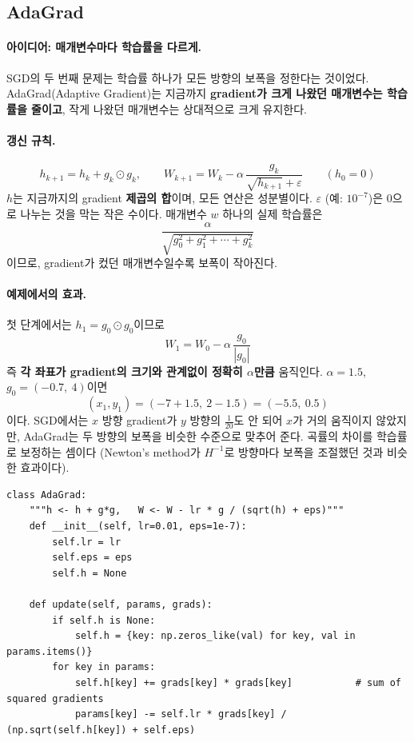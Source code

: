 \documentclass[11pt,a4paper]{article}
\begin{document}
\subsection{AdaGrad}\label{sec:adagrad}

\paragraph{아이디어: 매개변수마다 학습률을 다르게.}
SGD의 두 번째 문제는 학습률 하나가 모든 방향의 보폭을 정한다는 것이었다.
AdaGrad(Adaptive Gradient)는 지금까지 \textbf{gradient가 크게 나왔던 매개변수는 학습률을 줄이고},
작게 나왔던 매개변수는 상대적으로 크게 유지한다.

\paragraph{갱신 규칙.}
\[
\boxed{
h_{k+1}=h_k+g_k\odot g_k,
\qquad
W_{k+1}=W_k-\alpha\,\frac{g_k}{\sqrt{h_{k+1}}+\varepsilon}
}
\qquad(h_0=0)
\]
$h$는 지금까지의 gradient \textbf{제곱의 합}이며, 모든 연산은 성분별이다.
$\varepsilon$ (예: $10^{-7}$)은 $0$으로 나누는 것을 막는 작은 수이다.
매개변수 $w$ 하나의 실제 학습률은
\[
\frac{\alpha}{\sqrt{g_0^2+g_1^2+\cdots+g_k^2}}
\]
이므로, gradient가 컸던 매개변수일수록 보폭이 작아진다.

\paragraph{예제에서의 효과.}
첫 단계에서는 $h_1=g_0\odot g_0$이므로
\[
W_1=W_0-\alpha\,\frac{g_0}{|g_0|}
\]
즉 \textbf{각 좌표가 gradient의 크기와 관계없이 정확히 $\alpha$만큼} 움직인다.
$\alpha=1.5$, $g_0=(-0.7,\ 4)$이면
\[
(x_1,y_1)=(-7+1.5,\ 2-1.5)=(-5.5,\ 0.5)
\]
이다. SGD에서는 $x$ 방향 gradient가 $y$ 방향의 $\frac{1}{20}$도 안 되어 $x$가 거의 움직이지 않았지만,
AdaGrad는 두 방향의 보폭을 비슷한 수준으로 맞추어 준다.
곡률의 차이를 학습률로 보정하는 셈이다
(Newton's method가 $H^{-1}$로 방향마다 보폭을 조절했던 것과 비슷한 효과이다).

\begin{lstlisting}
class AdaGrad:
    """h <- h + g*g,   W <- W - lr * g / (sqrt(h) + eps)"""
    def __init__(self, lr=0.01, eps=1e-7):
        self.lr = lr
        self.eps = eps
        self.h = None

    def update(self, params, grads):
        if self.h is None:
            self.h = {key: np.zeros_like(val) for key, val in params.items()}
        for key in params:
            self.h[key] += grads[key] * grads[key]           # sum of squared gradients
            params[key] -= self.lr * grads[key] / (np.sqrt(self.h[key]) + self.eps)
\end{lstlisting}
\end{document}
